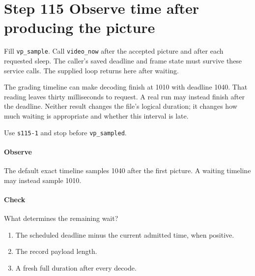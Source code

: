 \section{Step 115 Observe time after producing the picture}
Fill \texttt{vp\_sample}. Call \texttt{video\_now} after the accepted picture and after each requested sleep. The caller's saved deadline and frame state must survive these service calls. The supplied loop returns here after waiting.

The grading timeline can make decoding finish at 1010 with deadline 1040. That reading leaves thirty milliseconds to request. A real run may instead finish after the deadline. Neither result changes the file's logical duration; it changes how much waiting is appropriate and whether this interval is late.

Use \texttt{s115-1} and stop before \texttt{vp\_sampled}.

\paragraph{Observe} The default exact timeline samples 1040 after the first picture. A waiting timeline may instead sample 1010.

\paragraph{Check} What determines the remaining wait?
\begin{enumerate}[label=\Alph*.]
\item The scheduled deadline minus the current admitted time, when positive.
\item The record payload length.
\item A fresh full duration after every decode.
\end{enumerate}
